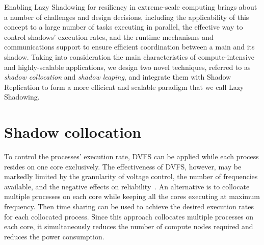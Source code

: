 Enabling Lazy Shadowing for resiliency in extreme-scale computing 
brings about a number of challenges and design decisions, including the applicability of this concept to a large number of 
tasks executing in parallel, the effective way to control shadows' execution rates, and the runtime mechanisms and 
communications support to ensure efficient coordination between a 
main and its shadow.
Taking into consideration the main characteristics of compute-intensive and highly-scalable applications, we design two novel techniques, referred to as {\it shadow collocation} and {\it shadow leaping}, 
and integrate them with Shadow Replication to form a more efficient and scalable paradigm that we call Lazy Shadowing.


\section{Shadow collocation}
To control the processes' execution rate, DVFS can be applied while each process resides on one core exclusively. 
The effectiveness of DVFS, however, may be markedly 
limited by the granularity of voltage control, the number of frequencies available, and the negative effects on 
reliability~\cite{Eyerman:2011:FDU:1952998.1952999,Keller:EECS-2015-257,chandra2008defect,zhao2008reliability}. 
An alternative is to collocate multiple processes on each core while keeping all the cores executing at maximum frequency. 
Then time sharing can be used to achieve the desired execution rates for each collocated process. 
Since this approach collocates multiple processes on each  core, it simultaneously reduces the number of compute nodes required and 
reduces the power consumption. 


